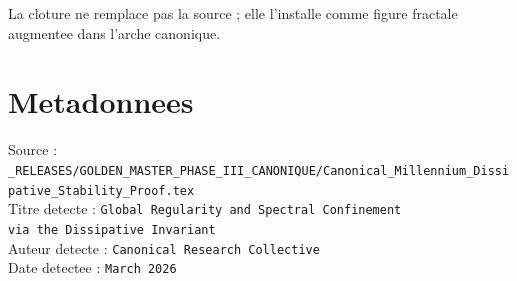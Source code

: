 ﻿\documentclass[11pt,a4paper]{article}
\begin{document}
La cloture ne remplace pas la source ; elle l'installe comme figure fractale augmentee dans l'arche canonique.



\section*{Metadonnees}

Source : \verb|_RELEASES/GOLDEN_MASTER_PHASE_III_CANONIQUE/Canonical_Millennium_Dissipative_Stability_Proof.tex|\\

Titre detecte : \texttt{Global Regularity and Spectral Confinement\\ via the Dissipative Invariant}\\

Auteur detecte : \texttt{Canonical Research Collective}\\

Date detectee : \texttt{March 2026}
\end{document}
